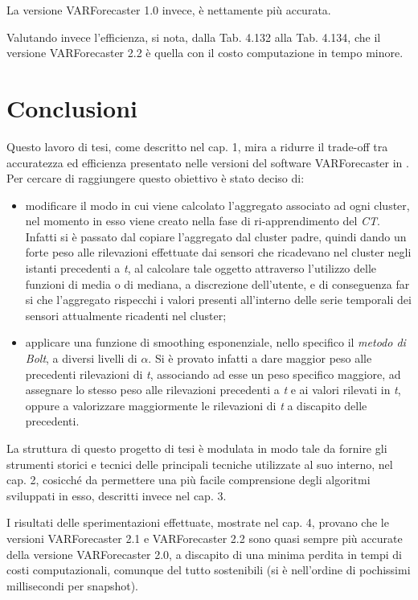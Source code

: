 \documentclass[12pt,a4paper,oneside,openright]{book}
\begin{document}
La versione VARForecaster 1.0 invece, è nettamente più accurata.

Valutando invece l'efficienza, si nota, dalla Tab. 4.132 alla Tab. 4.134, che il versione VARForecaster 2.2 è quella con il costo computazione in tempo minore.

\chapter{Conclusioni}
Questo lavoro di tesi, come descritto nel cap. 1, mira a ridurre il trade-off tra accuratezza ed efficienza presentato nelle versioni del software VARForecaster in \cite{donato}. Per cercare di raggiungere questo obiettivo è stato deciso di:
\begin{itemize}
\item modificare il modo in cui viene calcolato l'aggregato associato ad ogni cluster, nel momento in esso viene creato nella fase di ri-apprendimento del \textit{CT}. Infatti si è passato dal copiare l'aggregato dal cluster padre, quindi dando un forte peso alle rilevazioni effettuate dai sensori che ricadevano nel cluster negli istanti precedenti a \textit{t}, al calcolare tale oggetto attraverso l'utilizzo delle funzioni di media o di mediana, a discrezione dell'utente, e di conseguenza far si che l'aggregato rispecchi i valori presenti all'interno delle serie temporali dei sensori attualmente ricadenti nel cluster;
\item applicare una funzione di smoothing esponenziale, nello specifico il \textit{metodo di Bolt}, a diversi livelli di $\alpha$. Si è provato infatti a dare maggior peso alle precedenti rilevazioni di \textit{t}, associando ad esse un peso specifico maggiore, ad assegnare lo stesso peso alle rilevazioni precedenti a \textit{t} e ai valori rilevati in \textit{t}, oppure a valorizzare maggiormente le rilevazioni di \textit{t} a discapito delle precedenti.
\end{itemize}

La struttura di questo progetto di tesi è modulata in modo tale da fornire gli strumenti storici e tecnici delle principali tecniche utilizzate al suo interno, nel cap. 2, cosicché da permettere una più facile comprensione degli algoritmi sviluppati in esso, descritti invece nel cap. 3. 

I risultati delle sperimentazioni effettuate, mostrate nel cap. 4, provano che le versioni VARForecaster 2.1 e VARForecaster 2.2 sono quasi sempre più accurate della versione VARForecaster 2.0, a discapito di una minima perdita in tempi di costi computazionali, comunque del tutto sostenibili (si è nell'ordine di pochissimi millisecondi per snapshot).
\end{document}
